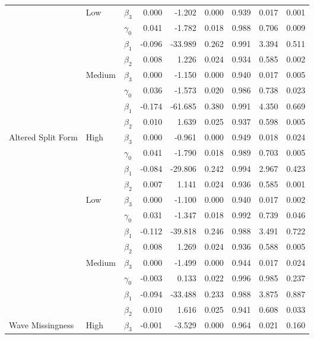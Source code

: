 \documentclass{article}\usepackage[]{graphicx}\usepackage[]{color}
\newenvironment{knitrout}{}{} %
\begin{document}
\begin{knitrout}
\begin{table}[H]
{\begin{tabular}[t]{l|l|l|r|r|r|r|r|r}
\cline{3-9}
 & \multirow{-4}{*}{\raggedright\arraybackslash Low} & $\beta_3$ & 0.000 & -1.202 & 0.000 & 0.939 & 0.017 & 0.001\\
\cline{2-9}
 &  & $\gamma_0$ & 0.041 & -1.782 & 0.018 & 0.988 & 0.706 & 0.009\\
\cline{3-9}
 &  & $\beta_1$ & -0.096 & -33.989 & 0.262 & 0.991 & 3.394 & 0.511\\
\cline{3-9}
 &  & $\beta_2$ & 0.008 & 1.226 & 0.024 & 0.934 & 0.585 & 0.002\\
\cline{3-9}
 & \multirow{-4}{*}{\raggedright\arraybackslash Medium} & $\beta_3$ & 0.000 & -1.150 & 0.000 & 0.940 & 0.017 & 0.005\\
\cline{2-9}
 &  & $\gamma_0$ & 0.036 & -1.573 & 0.020 & 0.986 & 0.738 & 0.023\\
\cline{3-9}
 &  & $\beta_1$ & -0.174 & -61.685 & 0.380 & 0.991 & 4.350 & 0.669\\
\cline{3-9}
 &  & $\beta_2$ & 0.010 & 1.639 & 0.025 & 0.937 & 0.598 & 0.005\\
\cline{3-9}
\multirow{-12}{*}{\raggedright\arraybackslash Altered Split Form} & \multirow{-4}{*}{\raggedright\arraybackslash High} & $\beta_3$ & 0.000 & -0.961 & 0.000 & 0.949 & 0.018 & 0.024\\
\cline{1-9}
 &  & $\gamma_0$ & 0.041 & -1.790 & 0.018 & 0.989 & 0.703 & 0.005\\
\cline{3-9}
 &  & $\beta_1$ & -0.084 & -29.806 & 0.242 & 0.994 & 2.967 & 0.423\\
\cline{3-9}
 &  & $\beta_2$ & 0.007 & 1.141 & 0.024 & 0.936 & 0.585 & 0.001\\
\cline{3-9}
 & \multirow{-4}{*}{\raggedright\arraybackslash Low} & $\beta_3$ & 0.000 & -1.100 & 0.000 & 0.940 & 0.017 & 0.002\\
\cline{2-9}
 &  & $\gamma_0$ & 0.031 & -1.347 & 0.018 & 0.992 & 0.739 & 0.046\\
\cline{3-9}
 &  & $\beta_1$ & -0.112 & -39.818 & 0.246 & 0.988 & 3.491 & 0.722\\
\cline{3-9}
 &  & $\beta_2$ & 0.008 & 1.269 & 0.024 & 0.936 & 0.588 & 0.005\\
\cline{3-9}
 & \multirow{-4}{*}{\raggedright\arraybackslash Medium} & $\beta_3$ & 0.000 & -1.499 & 0.000 & 0.944 & 0.017 & 0.024\\
\cline{2-9}
 &  & $\gamma_0$ & -0.003 & 0.133 & 0.022 & 0.996 & 0.985 & 0.237\\
\cline{3-9}
 &  & $\beta_1$ & -0.094 & -33.488 & 0.233 & 0.988 & 3.875 & 0.887\\
\cline{3-9}
 &  & $\beta_2$ & 0.010 & 1.616 & 0.025 & 0.941 & 0.608 & 0.033\\
\cline{3-9}
\multirow{-12}{*}{\raggedright\arraybackslash Wave Missingness} & \multirow{-4}{*}{\raggedright\arraybackslash High} & $\beta_3$ & -0.001 & -3.529 & 0.000 & 0.964 & 0.021 & 0.160\\
\hline
\end{tabular}}
\end{table}


\end{knitrout}
\end{document}
